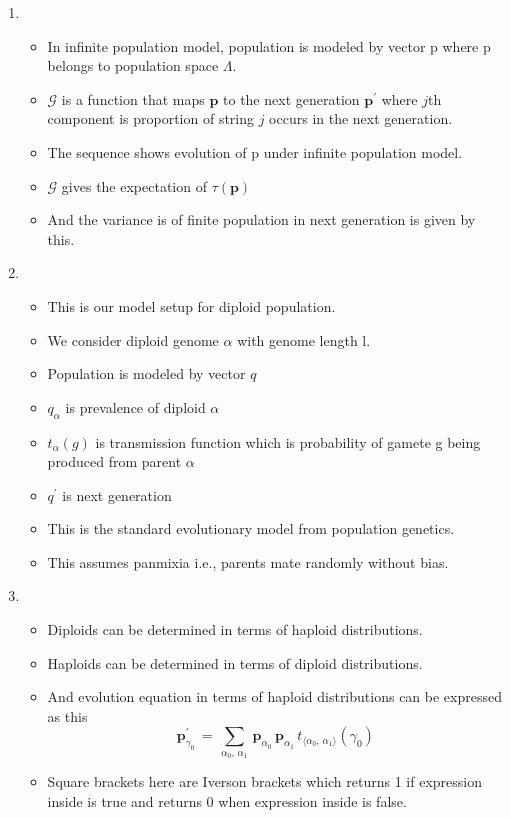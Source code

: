 \documentclass{article}
\begin{document}
\begin{enumerate}
\begin{itemize}
  \end{itemize}
    
\item
  \begin{itemize}
  \item In infinite population model, population is modeled by vector p where p belongs to population space $\Lambda$.    
  \item $\mathcal{G}$ is a function that maps $\bm{p}$ to the next
    generation $\bm{p}^\prime$ where $j$th component is proportion of string $j$
    occurs in the next generation.
  \item The sequence shows evolution of p under infinite population
    model.
    \item $\mathcal{G}$ gives the expectation of $\tau(\bm{p})$
  \item And the variance is of finite population in next generation is given by this.
  \end{itemize}
    
\item
  \begin{itemize}
  \item This is our model setup for diploid population.
  \item We consider diploid genome $\alpha$ with genome length l.
  \item Population is modeled by vector $q$
  \item $q_\alpha$ is prevalence of diploid $\alpha$
  \item $t_{\alpha}(g)$ is transmission function which is probability
    of gamete g being produced from parent $\alpha$
  \item $q^\prime$ is next generation
  \item This is the standard evolutionary model from population genetics. 
  \item This assumes panmixia i.e., parents mate randomly without bias.
  \end{itemize}
    
\item
  \begin{itemize}
  \item Diploids can be determined in terms of haploid
    distributions.
  \item Haploids can be determined in terms of diploid
    distributions.
  \item And evolution equation in terms of haploid
    distributions can be expressed as this
    \[\bm{p}_{\gamma_0}^{\prime} \,=\, \sum_{\alpha_0, \, \alpha_1} \, \bm{p}_{\alpha_0} \, \bm{p}_{\alpha_1} \,
	  t_{\langle \alpha_0, \,\alpha_1 \rangle}(\gamma_0) \]	  
  \item Square brackets here are Iverson brackets which returns 1 if expression inside is true and returns 0 when expression inside is false.  
  

\end{itemize}
\end{enumerate}
\end{document}
